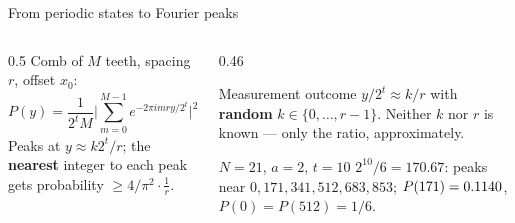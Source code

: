 \documentclass[aspectratio=169,11pt]{beamer}
\newcommand{\key}[1]{{\color{qdark}\textbf{#1}}}
\begin{document}
\begin{frame}[label=fQFTPeaks]{From periodic states to Fourier peaks}
  \begin{columns}[T]
    \begin{column}{0.5\textwidth}
      \small
      Comb of $M$ teeth, spacing $r$, offset $x_0$:
      \[ P(y) = \frac{1}{2^tM}\Big|\sum_{m=0}^{M-1}e^{-2\pi imry/2^t}\Big|^2 = \frac{\sin^2(\pi Mry/2^t)}{2^tM\sin^2(\pi ry/2^t)} \]
      Peaks at $y \approx k2^t/r$; the \key{nearest} integer to each peak gets probability $\ge 4/\pi^2 \cdot \frac1r$.
    \end{column}
    \begin{column}{0.46\textwidth}
      \begin{block}{Measurement outcome}
        \small $y/2^t \approx k/r$ with \key{random} $k \in \{0, \dots, r - 1\}$. Neither $k$ nor $r$ is known --- only the ratio, approximately.
      \end{block}
      \begin{exampleblock}{$N = 21$, $a = 2$, $t = 10$}
        \small $2^{10}/6 = 170.67$: peaks near $0, 171, 341, 512, 683, 853$; $P(171) = 0.1140$, $P(0) = P(512) = 1/6$.
      \end{exampleblock}
    \end{column}
  \end{columns}
\end{frame}
\end{document}
